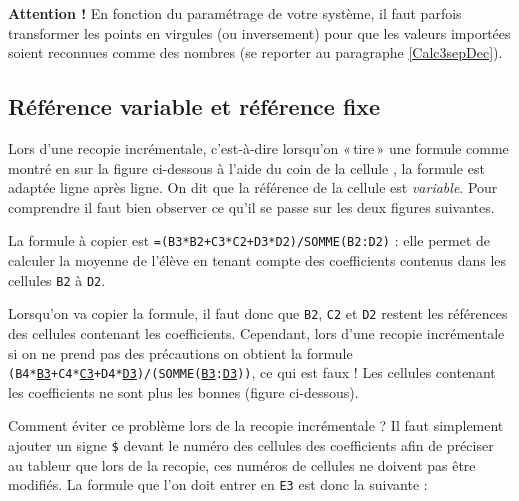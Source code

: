 



\textbf{Attention !} En fonction du paramétrage de votre système, il faut parfois transformer les points en virgules (ou inversement) pour que les valeurs importées soient reconnues comme des nombres (se reporter au paragraphe \vref{Calc3sepDec}).



\subsection{Référence variable et référence fixe}\label{Calc3reference} 

Lors d'une recopie incrémentale, c'est-à-dire lorsqu'on «\,tire\,» une formule comme montré en  sur la figure ci-dessous à l'aide du coin de la cellule , la formule est adaptée ligne après ligne. On dit que la référence de la cellule est \emph{variable}. Pour comprendre il faut bien observer ce qu'il se passe sur les deux figures suivantes.


La formule à copier est \texttt{=(B3*B2+C3*C2+D3*D2)/SOMME(B2:D2)} : elle permet de calculer la moyenne de l'élève en tenant compte des coefficients contenus dans les cellules \texttt{B2} à \texttt{D2}.

Lorsqu'on va copier la formule, il faut donc que \texttt{B2}, \texttt{C2} et \texttt{D2} restent les références des cellules contenant les coefficients. Cependant, lors d'une recopie incrémentale si on ne prend pas des précautions on obtient la formule \texttt{(B4*\underline{B3}+C4*\underline{C3}+D4*\underline{D3})/(SOMME(\underline{B3}:\underline{D3}))}, ce qui est faux ! Les cellules contenant les coefficients ne sont plus les bonnes (figure ci-dessous).


Comment éviter ce problème lors de la recopie incrémentale ? Il faut simplement ajouter un signe \texttt{\$} devant le numéro des cellules des coefficients afin de préciser au tableur que lors de la recopie, ces numéros de cellules ne doivent pas être modifiés. La formule que l'on doit entrer en \texttt{E3} est donc la suivante :

